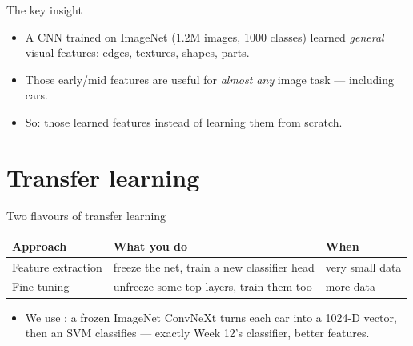 \documentclass[10pt,aspectratio=169]{beamer}
\begin{document}
\begin{frame}{The key insight}
  \begin{itemize}
    \item A CNN trained on ImageNet (1.2M images, 1000 classes) learned \emph{general} visual features:
          edges, textures, shapes, parts.
    \item Those early/mid features are useful for \emph{almost any} image task — including cars.
    \item So:  those learned features instead of learning them from scratch.
  \end{itemize}
\end{frame}

\section{Transfer learning}

\begin{frame}{Two flavours of transfer learning}
  \begin{center}
  \begin{tabular}{@{}lll@{}}
    \toprule
    \textbf{Approach} & \textbf{What you do} & \textbf{When} \\
    \midrule
    Feature extraction & freeze the net, train a new classifier head & very small data \\
    Fine-tuning & unfreeze some top layers, train them too & more data \\
    \bottomrule
  \end{tabular}
  \end{center}
  \begin{itemize}
    \item We use : a frozen ImageNet ConvNeXt turns each car into a 1024-D vector,
          then an SVM classifies — exactly Week 12's classifier, better features.
  \end{itemize}
\end{frame}
\end{document}
